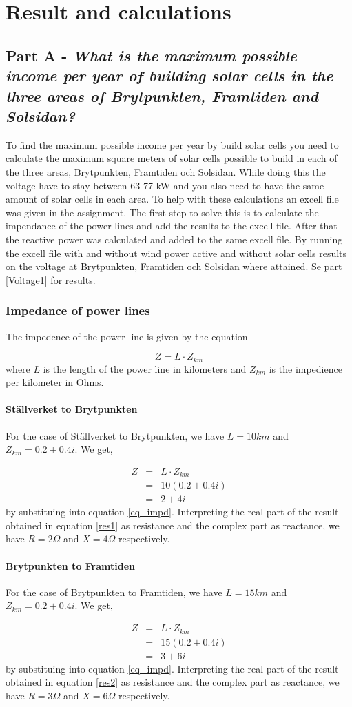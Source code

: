 \documentclass{report}
\newcommand{\case}[1]{\subsubsection*{#1}}
\newcommand{\cmp}[2]{\ensuremath{#1+#2i}}
\newcommand{\mypart}[2]{\section*{Part #1 - \textit{#2}}}
\newcommand{\mysubpart}[1]{\subsection*{#1}}
\begin{document}
\chapter*{Result and calculations}
\mypart{A}{What is the maximum possible income per year of building solar cells in the three areas of Brytpunkten, Framtiden and Solsidan?}
To find the maximum possible income per year by build solar cells you need to calculate the maximum square meters of solar cells possible to build in each of the three areas, Brytpunkten, Framtiden och Solsidan. While doing this the voltage have to stay between 63-77 kW and you also need to have the same amount of solar cells in each area. To help with these calculations an excell file was given in the assignment. The first step to solve this is to calculate the impendance of the power lines and add the results to the excell file.  After that the reactive power was calculated and added to the same excell file. By running the excell file with and without wind power active and without solar cells results on the voltage at Brytpunkten, Framtiden och Solsidan where attained. Se part \ref{Voltage1} for results.  

\mysubpart{Impedance of power lines}
The impedence of the power line is given by the equation 

\begin{equation}\label{eq_impd}
Z =  L \cdot Z_{km}
\end{equation} where $L$ is the length of the power line in kilometers and $Z_{km}$ is the impedience per kilometer in Ohms.

\case{Ställverket to Brytpunkten}
For the case of Ställverket to Brytpunkten, we have $L=10km$ and $Z_{km}=\cmp{0.2}{0.4}$.  We get,

\begin{eqnarray}
Z&=&  L \cdot Z_{km} \\
&=&10 (\cmp{0.2}{0.4}) \\
&=& \cmp{2}{4} \label{res1}
\end{eqnarray} by substituing into equation \ref{eq_impd}. Interpreting the real part of the result obtained in equation \ref{res1} as resistance and the complex part as reactance, we have $R=2\Omega$ and $X=4\Omega$ respectively.

\case {Brytpunkten to Framtiden}
For the case of Brytpunkten to Framtiden, we have $L=15km$ and $Z_{km}=\cmp{0.2}{0.4}$.  We get,

\begin{eqnarray}
Z&=&  L \cdot Z_{km} \\
&=&15 (\cmp{0.2}{0.4}) \\
&=& \cmp{3}{6} \label{res2}
\end{eqnarray} by substituing into equation \ref{eq_impd}. Interpreting the real part of the result obtained in equation \ref{res2} as resistance and the complex part as reactance, we have $R=3\Omega$ and $X=6\Omega$ respectively.
\end{document}
